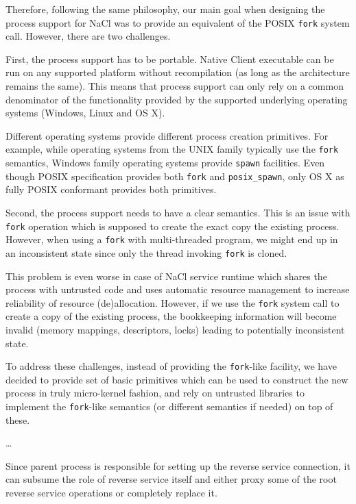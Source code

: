 Therefore, following the same philosophy, our main goal when designing
the process support for NaCl was to provide an equivalent of the POSIX
\lstinline`fork` system call. However, there are two challenges.

First, the process support has to be portable. Native Client executable
can be run on any supported platform without recompilation (as long as
the architecture remains the same). This means that process support can
only rely on a common denominator of the functionality provided by the
supported underlying operating systems (\ie Windows, Linux and OS X).

Different operating systems provide different process creation
primitives. For example, while operating systems from the UNIX family
typically use the \lstinline`fork` semantics, Windows family operating
systems provide \lstinline`spawn` facilities. Even though POSIX
specification provides both \lstinline`fork` and \lstinline`posix_spawn`,
only OS X as fully POSIX conformant provides both primitives.

Second, the process support needs to have a clear semantics. This is an
issue with \lstinline`fork` operation which is supposed to create the
exact copy the existing process. However, when using a \lstinline`fork`
with multi-threaded program, we might end up in an inconsistent state
since only the thread invoking \lstinline`fork` is cloned.

This problem is even worse in case of NaCl service runtime which shares
the process with untrusted code and uses automatic resource management
to increase reliability of resource (de)allocation. However, if we use
the \lstinline`fork` system call to create a copy of the existing process,
the bookkeeping information will become invalid (\eg memory mappings,
descriptors, locks) leading to potentially inconsistent state.

To address these challenges, instead of providing the
\lstinline`fork`-like facility, we have decided to provide set of basic
primitives which can be used to construct the new process in truly
micro-kernel fashion, and rely on untrusted libraries to implement the
\lstinline`fork`-like semantics (\eg or different semantics if needed) on
top of these.

\ldots

Since parent process is responsible for setting up the reverse service
connection, it can subsume the role of reverse service itself and either
proxy some of the root reverse service operations or completely replace
it.

